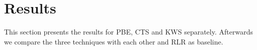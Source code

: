 \documentclass[\myrootdir/main.tex]{subfiles}
\begin{document}

\section{Results}
This section presents the results for PBE, CTS and KWS separately.
Afterwards we compare the three techniques with each other and RLR as baseline.



\end{document}
